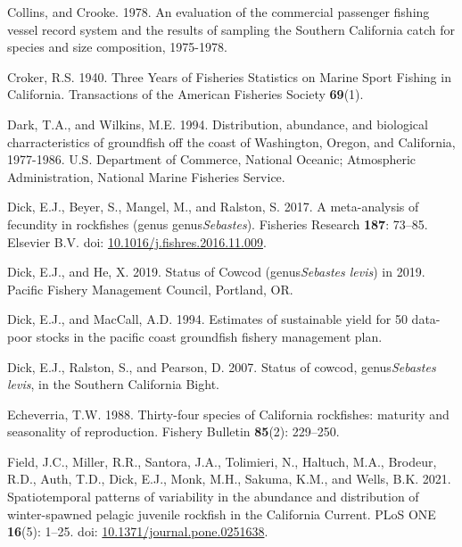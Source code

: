 \documentclass[
  english,
  a4paper,
]{article}
\newlength{\cslhangindent}
\newlength{\cslentryspacingunit} %
\newenvironment{CSLReferences}[2] %
 {%
  \setlength{\parindent}{0pt}
  \ifodd #1
  \let\oldpar\par
  \def\par{\hangindent=\cslhangindent\oldpar}
  \fi
  \setlength{\parskip}{#2\cslentryspacingunit}
 }%
 {}
\begin{document}
\begin{CSLReferences}{1}{0}
\leavevmode{}%
Collins, and Crooke. 1978. {An evaluation of the commercial passenger fishing vessel record system and the results of sampling the Southern California catch for species and size composition, 1975-1978.}

\leavevmode{}%
Croker, R.S. 1940. {Three Years of Fisheries Statistics on Marine Sport Fishing in California}. Transactions of the American Fisheries Society \textbf{69}(1).

\leavevmode{}%
Dark, T.A., and Wilkins, M.E. 1994. {Distribution, abundance, and biological charracteristics of groundfish off the coast of Washington, Oregon, and California, 1977-1986}. U.S. Department of Commerce, National Oceanic; Atmospheric Administration, National Marine Fisheries Service.

\leavevmode{}%
Dick, E.J., Beyer, S., Mangel, M., and Ralston, S. 2017. {A meta-analysis of fecundity in rockfishes (genus genus\emph{Sebastes})}. Fisheries Research \textbf{187}: 73--85. Elsevier B.V. doi: \href{https://doi.org/10.1016/j.fishres.2016.11.009}{10.1016/j.fishres.2016.11.009}.

\leavevmode{}%
Dick, E.J., and He, X. 2019. {Status of Cowcod (genus\emph{Sebastes levis}) in 2019}. Pacific Fishery Management Council, Portland, OR.

\leavevmode{}%
Dick, E.J., and MacCall, A.D. 1994. {Estimates of sustainable yield for 50 data-poor stocks in the pacific coast groundfish fishery management plan}.

\leavevmode{}%
Dick, E.J., Ralston, S., and Pearson, D. 2007. {Status of cowcod, genus\emph{Sebastes levis}, in the Southern California Bight}.

\leavevmode{}%
Echeverria, T.W. 1988. {Thirty-four species of California rockfishes: maturity and seasonality of reproduction}. Fishery Bulletin \textbf{85}(2): 229--250.

\leavevmode{}%
Field, J.C., Miller, R.R., Santora, J.A., Tolimieri, N., Haltuch, M.A., Brodeur, R.D., Auth, T.D., Dick, E.J., Monk, M.H., Sakuma, K.M., and Wells, B.K. 2021. {Spatiotemporal patterns of variability in the abundance and distribution of winter-spawned pelagic juvenile rockfish in the California Current}. PLoS ONE \textbf{16}(5): 1--25. doi: \href{https://doi.org/10.1371/journal.pone.0251638}{10.1371/journal.pone.0251638}.


\end{CSLReferences}
\end{document}
